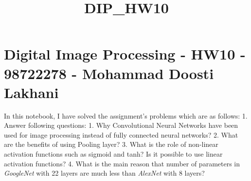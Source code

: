 \documentclass[11pt]{article}
\title{DIP\_HW10}
\begin{document}
    
    
    \maketitle
    
    

    
    \hypertarget{digital-image-processing---hw10---98722278---mohammad-doosti-lakhani}{%
\section{Digital Image Processing - HW10 - 98722278 - Mohammad Doosti
Lakhani}\label{digital-image-processing---hw10---98722278---mohammad-doosti-lakhani}}

In this notebook, I have solved the assignment's problems which are as
follows: 1. Answer following questions: 1. Why Convolutional Neural
Networks have been used for image processing instead of fully connected
neural networks? 2. What are the benefits of using Pooling layer? 3.
What is the role of non-linear activation functions such as sigmoid and
tanh? Is it possible to use linear activation functions? 4. What is the
main reason that number of parameters in \emph{GoogleNet} with 22 layers
are much less than \emph{AlexNet} with 8 layers?
\end{document}
